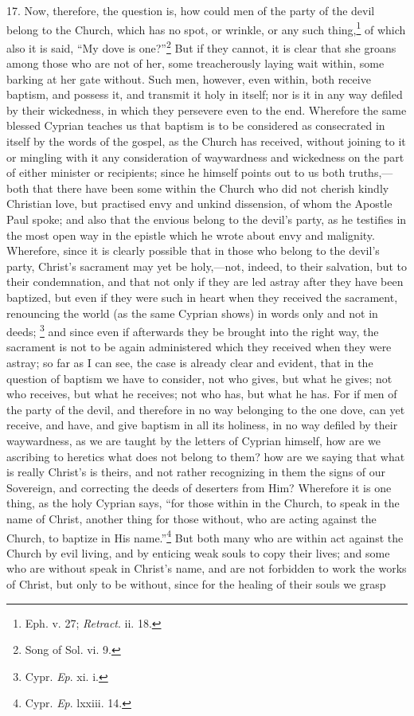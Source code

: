 17. Now, therefore, the question is, how could men of the party of the devil belong to the Church, which has no spot, or wrinkle, or any such thing,\footnote{\par  Eph. v. 27; \emph{Retract}. ii. 18.} of which also it is said, ``My dove is one?''\footnote{\par  Song of Sol. vi. 9.} But if they cannot, it is clear that she groans among those who are not of her, some treacherously laying wait within, some barking at her gate without. Such men, however, even within, both receive baptism, and possess it, and transmit it holy in itself; nor is it in any way defiled by their wickedness, in which they persevere even to the end. Wherefore the same blessed Cyprian teaches us that baptism is to be considered as consecrated in itself by the words of the gospel, as the Church has received, without joining to it or mingling with it any consideration of waywardness and wickedness on the part of either minister or recipients; since he himself points out to us both truths,—both that there have been some within the Church who did not cherish kindly Christian love, but practised envy and unkind dissension, of whom the Apostle Paul spoke; and also that the envious belong to the devil’s party, as he testifies in the most open way in the epistle which he wrote about envy and malignity. Wherefore, since it is clearly possible that in those who belong to the devil’s party, Christ’s sacrament may yet be holy,—not, indeed, to their salvation, but to their condemnation, and that not only if they are led astray after they have been baptized, but even if they were such in heart when they received the sacrament, renouncing the world (as the same Cyprian shows) in words only and not in deeds; \footnote{\par  Cypr. \emph{Ep}. xi. i.} and since even if afterwards they be brought into the right way, the sacrament is not to be again administered which they received when they were astray; so far as I can see, the case is already clear and evident, that in the question of baptism we have to consider, not who gives, but what he gives; not who receives, but what he receives; not who has, but what he has. For if men of the party of the devil, and therefore in no way belonging to the one dove, can yet receive, and have, and give baptism in all its holiness, in no way defiled by their waywardness, as we are taught by the letters of Cyprian himself, how are we ascribing to heretics what does not belong to them? how are we saying that what is really Christ’s is theirs, and not rather recognizing in them the signs of our Sovereign, and correcting the deeds of deserters from Him? Wherefore it is one thing, as the holy Cyprian says, ``for those within in the Church, to speak in the name of Christ, another thing for those without, who are acting against the Church, to baptize in His name.''\footnote{\par  Cypr. \emph{Ep}. lxxiii. 14.} But both many who are within act against the Church by evil living, and by enticing weak souls to copy their lives; and some who are without speak in Christ’s name, and are not forbidden to work the works of Christ, but only to be without, since for the healing of their souls we grasp 